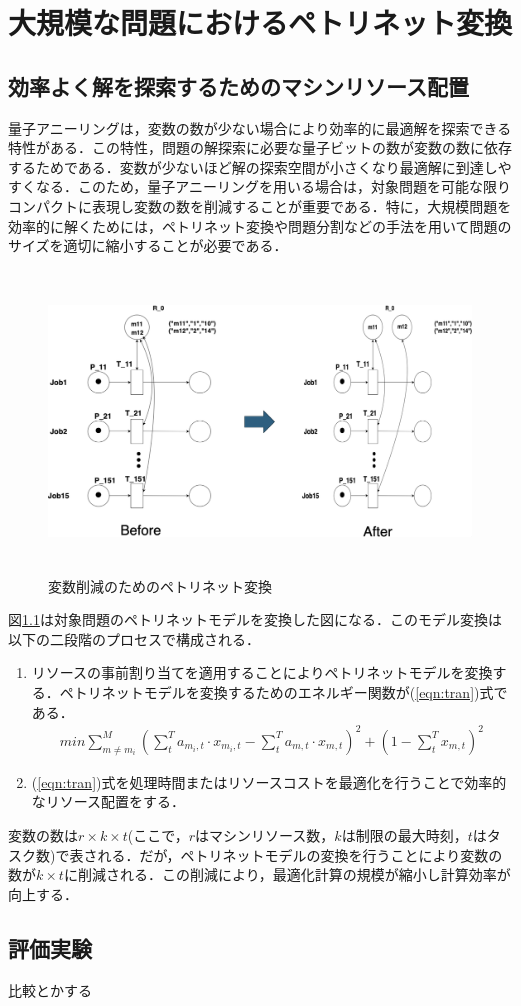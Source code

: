 \chapter{大規模な問題におけるペトリネット変換}
\label{main_survey}

\section{効率よく解を探索するためのマシンリソース配置}
量子アニーリングは，変数の数が少ない場合により効率的に最適解を探索できる特性がある．この特性，問題の解探索に必要な量子ビットの数が変数の数に依存するためである．変数が少ないほど解の探索空間が小さくなり最適解に到達しやすくなる．このため，量子アニーリングを用いる場合は，対象問題を可能な限りコンパクトに表現し変数の数を削減することが重要である．特に，大規模問題を効率的に解くためには，ペトリネット変換や問題分割などの手法を用いて問題のサイズを適切に縮小することが必要である．

\begin{figure}[H]
    \centering
    \includegraphics[width=0.8\linewidth, height=8cm]{./images/transformation.png}
    \caption{変数削減のためのペトリネット変換}
    \label{fig:fig2}
\end{figure}

図\ref{fig:fig2}は対象問題のペトリネットモデルを変換した図になる．このモデル変換は以下の二段階のプロセスで構成される．

\begin{enumerate} 
\item リソースの事前割り当てを適用することによりペトリネットモデルを変換する．ペトリネットモデルを変換するためのエネルギー関数が(\ref{eqn:tran})式である．
\begin{align} 
min \sum_{m \ne m_i}^M \left( \sum_t^T a_{m_i,t} \cdot x_{m_i,t} - \sum_t^T a_{m,t} \cdot x_{m,t}\right)^2 + \left(1 - \sum_t^T x_{m,t} \right)^2 \label{eqn:tran} 
\end{align}

\item (\ref{eqn:tran})式を処理時間またはリソースコストを最適化を行うことで効率的なリソース配置をする．
\end{enumerate}

変数の数は$r \times k \times t$(ここで，$r$はマシンリソース数，$k$は制限の最大時刻，$t$はタスク数)で表される．だが，ペトリネットモデルの変換を行うことにより変数の数が$k \times t$に削減される．この削減により，最適化計算の規模が縮小し計算効率が向上する．

\section{評価実験}

比較とかする




